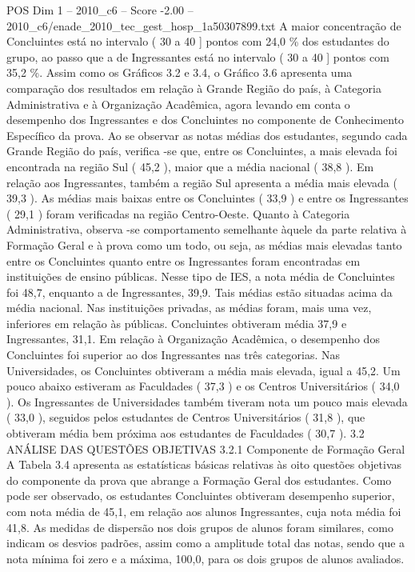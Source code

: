 \begin{textsample}{POS Dim 1 – 2010\_c6 – Score -2.00 – 2010\_c6/enade\_2010\_tec\_gest\_hosp\_1a50307899.txt}
A maior concentração de Concluintes está no intervalo ( 30 a 40 ] pontos com 24,0 \% dos estudantes do grupo, ao passo que a de Ingressantes está no intervalo ( 30 a 40 ] pontos com 35,2 \%.
Assim como os Gráficos 3.2 e 3.4, o Gráfico 3.6 apresenta uma comparação dos resultados em relação à Grande Região do país, à Categoria Administrativa e à Organização Acadêmica, agora levando em conta o desempenho dos Ingressantes e dos Concluintes no componente de Conhecimento Específico da prova.
Ao se observar as notas médias dos estudantes, segundo cada Grande Região do país, verifica -se que, entre os Concluintes, a mais elevada foi encontrada na região Sul ( 45,2 ), maior que a média nacional ( 38,8 ).
Em relação aos Ingressantes, também a região Sul apresenta a média mais elevada ( 39,3 ).
As médias mais baixas entre os Concluintes ( 33,9 ) e entre os Ingressantes ( 29,1 ) foram verificadas na região Centro-Oeste.
Quanto à Categoria Administrativa, observa -se comportamento semelhante àquele da parte relativa à Formação Geral e à prova como um todo, ou seja, as médias mais elevadas tanto entre os Concluintes quanto entre os Ingressantes foram encontradas em instituições de ensino públicas.
Nesse tipo de IES, a nota média de Concluintes foi 48,7, enquanto a de Ingressantes, 39,9.
Tais médias estão situadas acima da média nacional.
Nas instituições privadas, as médias foram, mais uma vez, inferiores em relação às públicas.
Concluintes obtiveram média 37,9 e Ingressantes, 31,1.
Em relação à Organização Acadêmica, o desempenho dos Concluintes foi superior ao dos Ingressantes nas três categorias.
Nas Universidades, os Concluintes obtiveram a média mais elevada, igual a 45,2.
Um pouco abaixo estiveram as Faculdades ( 37,3 ) e os Centros Universitários ( 34,0 ).
Os Ingressantes de Universidades também tiveram nota um pouco mais elevada ( 33,0 ), seguidos pelos estudantes de Centros Universitários ( 31,8 ), que obtiveram média bem próxima aos estudantes de Faculdades ( 30,7 ). 3.2 ANÁLISE DAS QUESTÕES OBJETIVAS 3.2.1 Componente de Formação Geral A Tabela 3.4 apresenta as estatísticas básicas relativas às oito questões objetivas do componente da prova que abrange a Formação Geral dos estudantes.
Como pode ser observado, os estudantes Concluintes obtiveram desempenho superior, com nota média de 45,1, em relação aos alunos Ingressantes, cuja nota média foi 41,8.
As medidas de dispersão nos dois grupos de alunos foram similares, como indicam os desvios padrões, assim como a amplitude total das notas, sendo que a nota mínima foi zero e a máxima, 100,0, para os dois grupos de alunos avaliados.

\end{textsample}
